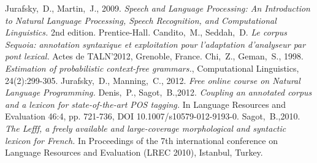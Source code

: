 \documentclass[12pt]{article}
\begin{document}
\begin{thebibliography}{9}
    Jurafsky,~D., Martin,~J., 2009. \emph{Speech and Language Processing: An Introduction to Natural Language Processing, Speech Recognition, and Computational Linguistics.} 2nd edition. Prentice-Hall.
    Candito,~M., Seddah,~D.
    \emph{Le corpus Sequoia: annotation syntaxique et exploitation pour
    l'adaptation d'analyseur par pont lexical.} Actes de TALN'2012, Grenoble,
    France.
    Chi,~Z., Geman,~S., 1998.
    \emph{Estimation of probabilistic context-free grammars.}, Computational Linguistics, 24(2):299-305.
    Jurafsky,~D., Manning,~C., 2012. \emph{Free online course on Natural
    Language Programming.}
    Denis,~P., Sagot,~B.,2012.
    \emph{Coupling an annotated corpus and a lexicon for state-of-the-art POS
    tagging.} In Language Resources and Evaluation 46:4, pp. 721-736,
    DOI 10.1007/s10579-012-9193-0.
    Sagot,~B.,2010.
    \emph{The Lefff, a freely available and large-coverage morphological and
    syntactic lexicon for French.} In Proceedings of the 7th international
    conference on Language Resources and Evaluation (LREC 2010), Istanbul,
    Turkey.
    
\end{thebibliography}
\end{document}

